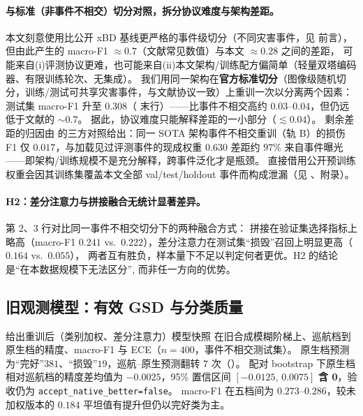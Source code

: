\paragraph{与标准（非事件不相交）切分对照，拆分协议难度与架构差距。}
本文刻意使用比公开 xBD 基线更严格的事件级切分（不同灾害事件，见  前言），
但由此产生的 macro-F1 $\approx 0.7$（文献常见数值）与本文 $\approx 0.28$ 之间的差距，
可能来自(i)评测协议更难，也可能来自(ii)本文架构/训练配方偏简单（轻量双塔编码器、有限训练轮次、无集成）。
我们用同一架构在\textbf{官方标准切分}（图像级随机切分，训练/测试可共享灾害事件，与文献协议一致）上重训一次以分离两个因素：
测试集 macro-F1 升至 $0.308$（ 末行）——比事件不相交高约 $0.03$--$0.04$，但仍远低于文献的 $\sim 0.7$。
据此，协议难度只能解释差距的一小部分（$\lesssim 0.04$）。
剩余差距的归因由  的三方对照给出：同一 SOTA 架构事件不相交重训（轨 B）的损伤 F1 仅 $0.017$，与加载见过评测事件的现成权重 $0.630$ 差距约 $97\%$ 来自事件曝光——即架构/训练规模不是充分解释，跨事件泛化才是瓶颈。
直接借用公开预训练权重会因其训练集覆盖本文全部 val/test/holdout 事件而构成泄漏（见 、附录）。

\paragraph{H2：差分注意力与拼接融合无统计显著差异。}
 第 2、3 行对比同一事件不相交切分下的两种融合方式：
拼接在验证集选择指标上略高（macro-F1 $0.241$ vs.\ $0.222$），差分注意力在测试集``损毁''召回上明显更高（$0.164$ vs.\ $0.055$），
两者互有胜负，样本量下不足以判定何者更优。H2 的结论是``在本数据规模下无法区分'', 而非任一方向的优势。

\begin{table}[htbp]
\centering
\small
\setlength{\tabcolsep}{3pt}
\caption{新旧 模型快照、两种融合架构与两种切分协议的 macro-F1 / 逐类召回对照。}
\label{tab:cpv2}
\resizebox{\linewidth}{!}{}
\end{table}

\begin{table}[htbp]
\centering
\small
\setlength{\tabcolsep}{3pt}
\caption{类别加权训练下的逐训练轮次 train/val macro-F1（训练内有信号、验证集不改善）。}
\label{tab:traincurve}
\resizebox{\linewidth}{!}{}
\end{table}

\subsection{旧观测模型：有效 GSD 与分类质量}
\label{sec:x1}
 给出重训后（类别加权、差分注意力）模型快照 在旧合成模糊阶梯上、巡航档到原生档的精度、macro-F1 与 ECE（$n=400$，事件不相交测试集）。
原生档预测为``完好''$381$、``损毁''$19$，巡航--原生预测翻转 $7$ 次（）。
配对 bootstrap 下原生档相对巡航档的精度差均值为 $-0.0025$，95\% 置信区间 $[-0.0125,\,0.0075]$ \textbf{含 0}，验收仍为 \texttt{accept\_native\_better=false}。
macro-F1 在五档间为 $0.273$--$0.286$，较未加权版本的 $0.184$ 平坦值有提升但仍以完好类为主。

